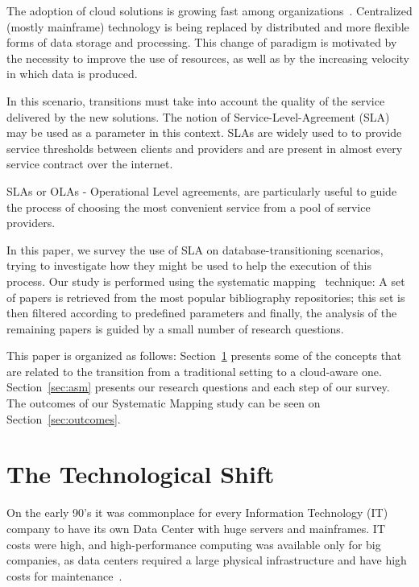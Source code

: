 \documentclass[a4paper]{IEEEtran}
\begin{document}
The adoption of cloud solutions is growing fast among organizations~\cite{6546068}.
Centralized (mostly mainframe) technology is being replaced by distributed and more flexible forms of data storage and processing.
This change of paradigm is motivated by the necessity to improve the use of resources, as well as by the increasing velocity in which data is produced.

In this scenario, transitions must take into account the quality of the service delivered by the new solutions.
The notion of Service-Level-Agreement (SLA)~\cite{6253526} may be used as a parameter in this context. SLAs are widely used to to provide service thresholds between clients and providers and are present in almost every service contract over the internet. 

SLAs or OLAs - Operational Level agreements, are particularly useful to guide the process of choosing the most convenient service from a pool of service providers.

In this paper, we survey the use of SLA on database-transitioning scenarios, trying to investigate how they might be used to help the execution of this process.
Our study is performed using the systematic mapping~\cite{Petersen:2008:SMS:2227115.2227123} technique: A set of papers is retrieved from the most popular bibliography repositories; this set is then filtered according to predefined parameters and finally, the analysis of the remaining papers is guided by a small number of research questions.

\bigskip

This paper is organized as follows: 
Section~\ref{sec:tts} presents some of the concepts that are related to the transition from a traditional setting to a cloud-aware one.
Section~\ref{sec:asm} presents our research questions and each step of our survey. The outcomes of our Systematic Mapping study can be seen on Section~\ref{sec:outcomes}.

\section{The Technological Shift}
\label{sec:tts}


On the early 90's it was commonplace for every Information Technology (IT) company to have its own Data Center with huge servers and mainframes. 
IT costs were high, and high-performance computing was available only for big companies, as data centers required a large physical infrastructure and have high costs for maintenance~\cite{Armbrust09m.:above}.
\end{document}
